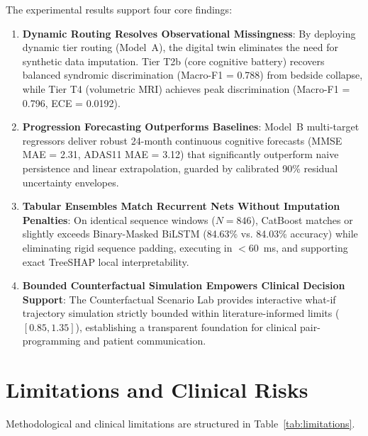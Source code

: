 \documentclass[11pt,a4paper]{article}
\begin{document}
The experimental results support four core findings:
\begin{enumerate}
    \item \textbf{Dynamic Routing Resolves Observational Missingness}: By deploying dynamic tier routing (Model~A), the digital twin eliminates the need for synthetic data imputation. Tier T2b (core cognitive battery) recovers balanced syndromic discrimination (Macro-F1 = 0.788) from bedside collapse, while Tier T4 (volumetric MRI) achieves peak discrimination (Macro-F1 = 0.796, ECE = 0.0192).
    \item \textbf{Progression Forecasting Outperforms Baselines}: Model~B multi-target regressors deliver robust 24-month continuous cognitive forecasts (MMSE MAE = 2.31, ADAS11 MAE = 3.12) that significantly outperform naive persistence and linear extrapolation, guarded by calibrated 90\% residual uncertainty envelopes.
    \item \textbf{Tabular Ensembles Match Recurrent Nets Without Imputation Penalties}: On identical sequence windows ($N = 846$), CatBoost matches or slightly exceeds Binary-Masked BiLSTM (84.63\% vs. 84.03\% accuracy) while eliminating rigid sequence padding, executing in $< 60$~ms, and supporting exact TreeSHAP local interpretability.
    \item \textbf{Bounded Counterfactual Simulation Empowers Clinical Decision Support}: The Counterfactual Scenario Lab provides interactive what-if trajectory simulation strictly bounded within literature-informed limits ($[0.85, 1.35]$), establishing a transparent foundation for clinical pair-programming and patient communication.
\end{enumerate}

\FloatBarrier


\section{Limitations and Clinical Risks}
\label{sec:limitations}

Methodological and clinical limitations are structured in Table~\ref{tab:limitations}.

\end{document}
